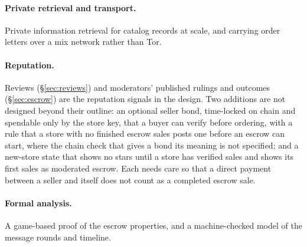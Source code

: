 \paragraph{Private retrieval and transport.} Private information retrieval for catalog records at scale, and carrying order letters over a mix network rather than Tor.

\paragraph{Reputation.} Reviews (\S\ref{sec:reviews}) and moderators' published rulings and outcomes (\S\ref{sec:escrow}) are the reputation signals in the design. Two additions are not designed beyond their outline: an optional seller bond, time-locked on chain and spendable only by the store key, that a buyer can verify before ordering, with a rule that a store with no finished escrow sales posts one before an escrow can start, where the chain check that gives a bond its meaning is not specified; and a new-store state that shows no stars until a store has verified sales and shows its first sales as moderated escrow. Each needs care so that a direct payment between a seller and itself does not count as a completed escrow sale.

\paragraph{Formal analysis.} A game-based proof of the escrow properties, and a machine-checked model of the message rounds and timeline.
